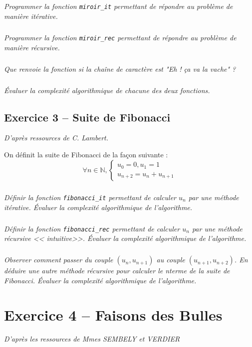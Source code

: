 \subparagraph{}
\textit{Programmer la fonction \texttt{miroir\_it} permettant de répondre au problème de manière itérative.}


\subparagraph{}
\textit{Programmer la fonction \texttt{miroir\_rec} permettant de répondre au problème de manière récursive.}


\subparagraph{}
\textit{Que renvoie la fonction si la chaîne de caractère est "Eh ! ça va la vache" ?}
 
 \subparagraph{}
\textit{Évaluer la complexité algorithmique de chacune des deux fonctions.}

 
\subsection*{Exercice 3 -- Suite de Fibonacci}
\textit{D'après ressources de C. Lambert.}

\setcounter{subparagraph}{0}
On définit la suite de Fibonacci de la façon suivante : 
$$
\forall n\in \mathbb{N}, \left\{ \begin{array}{l}
u_0 = 0, u_1 = 1 \\
u_{n+2} = u_{n} + u_{n+1}
\end{array}\right.
$$

\subparagraph{}
\textit{Définir la fonction \texttt{fibonacci\_it} permettant de calculer $u_n$ par une méthode itérative. Évaluer la 
complexité algorithmique de l'algorithme.}

\subparagraph{}
\textit{Définir la fonction \texttt{fibonacci\_rec} permettant de calculer $u_n$ par une méthode récursive << 
intuitive>>. Évaluer la complexité algorithmique de l'algorithme.}


\subparagraph{}
\textit{Observer comment passer du couple $(u_n,u_{n+1})$ au couple $(u_{n+1},u_{n+2})$. En déduire une autre méthode 
récursive pour calculer le n\ieme terme de la suite de Fibonacci. Évaluer la complexité algorithmique de l'algorithme.}

\section*{Exercice 4 -- Faisons des Bulles}
\textit{ D'après les ressources de Mmes SEMBELY et VERDIER}
\setcounter{subparagraph}{0}

